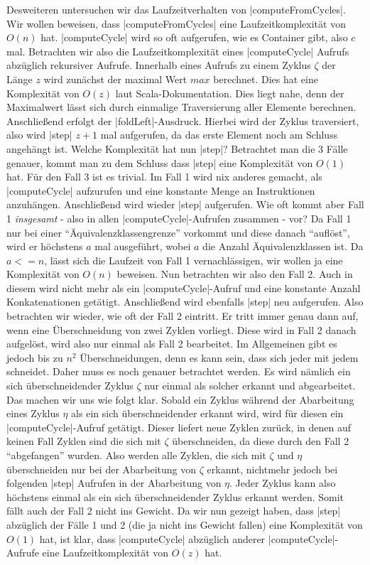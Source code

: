 Desweiteren untersuchen wir das Laufzeitverhalten von |computeFromCycles|. Wir wollen beweisen, dass |computeFromCycles| eine Laufzeitkomplexität von $O(n)$ hat.
|computeCycle| wird so oft aufgerufen, wie es Container gibt, also $c$ mal.
Betrachten wir also die Laufzeitkomplexität eines |computeCycle| Aufrufs abzüglich rekursiver Aufrufe.
Innerhalb eines Aufrufs zu einem Zyklus $\zeta$ der Länge $z$ wird zunächst der maximal Wert $max$ berechnet.
Dies hat eine Komplexität von $O(z)$ laut Scala-Dokumentation. Dies liegt nahe, denn der Maximalwert lässt sich durch einmalige Traversierung aller Elemente berechnen.
Anschließend erfolgt der |foldLeft|-Ausdruck. Hierbei wird der Zyklus traversiert, also wird |step| $z+1$ mal aufgerufen, da das erste Element noch am Schluss angehängt ist.
Welche Komplexität hat nun |step|? Betrachtet man die 3 Fälle genauer, kommt man zu dem Schluss dass |step| eine Komplexität von $O(1)$ hat.
Für den Fall 3 ist es trivial. Im Fall 1 wird nix anderes gemacht, als |computeCycle| aufzurufen und eine konstante Menge an Instruktionen anzuhängen.
Anschließend wird wieder |step| aufgerufen. Wie oft kommt aber Fall 1 \emph{insgesamt} - also in allen |computeCycle|-Aufrufen zusammen - vor?
Da Fall 1 nur bei einer ``Äquivalenzklassengrenze'' vorkommt und diese danach ``auflöst'', wird er höchstens $a$ mal ausgeführt, wobei $a$ die Anzahl Äquivalenzklassen ist.
Da $a <= n$, lässt sich die Laufzeit von Fall 1 vernachlässigen, wir wollen ja eine Komplexität von $O(n)$ beweisen.
Nun betrachten wir also den Fall 2. Auch in diesem wird nicht mehr als ein |computeCycle|-Aufruf und eine konstante Anzahl Konkatenationen getätigt.
Anschließend wird ebenfalls |step| neu aufgerufen. Also betrachten wir wieder, wie oft der Fall 2 eintritt.
Er tritt immer genau dann auf, wenn eine Überschneidung von zwei Zyklen vorliegt. Diese wird in Fall 2 danach aufgelöst, wird also nur einmal als Fall 2 bearbeitet.
Im Allgemeinen gibt es jedoch bis zu $n^2$ Überschneidungen, denn es kann sein, dass sich jeder mit jedem schneidet. Daher muss es noch genauer betrachtet werden.
Es wird nämlich ein sich überschneidender Zyklus $\zeta$ nur einmal als solcher erkannt und abgearbeitet. Das machen wir uns wie folgt klar.
Sobald ein Zyklus während der Abarbeitung eines Zyklus $\eta$ als ein sich überschneidender erkannt wird, wird für diesen ein |computeCycle|-Aufruf getätigt.
Dieser liefert neue Zyklen zurück, in denen auf keinen Fall Zyklen sind die sich mit $\zeta$ überschneiden, da diese durch den Fall 2 ``abgefangen'' wurden.
Also werden alle Zyklen, die sich mit $\zeta$ und $\eta$ überschneiden nur bei der Abarbeitung von $\zeta$ erkannt, nichtmehr jedoch bei folgenden |step| Aufrufen
in der Abarbeitung von $\eta$. Jeder Zyklus kann also höchstens einmal als ein sich überschneidender Zyklus erkannt werden. Somit fällt auch der Fall 2 nicht ins Gewicht.
Da wir nun gezeigt haben, dass |step| abzüglich der Fälle 1 und 2 (die ja nicht ins Gewicht fallen) eine Komplexität von $O(1)$ hat, ist klar, dass
|computeCycle| abzüglich anderer |computeCycle|-Aufrufe eine Laufzeitkomplexität von $O(z)$ hat.\\

